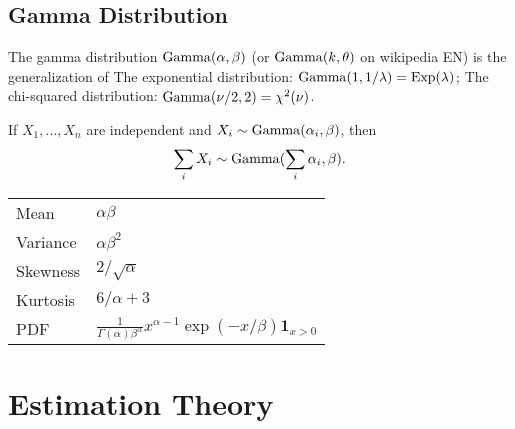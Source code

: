 \documentclass[10pt]{article}
\begin{document}
\subsection{Gamma Distribution}
\begin{outline}
  \1 The gamma distribution $\operatorname{Gamma}(\alpha,\beta)$ (or $\operatorname{Gamma}(k,\theta)$ on
  wikipedia EN) is the generalization of 
  \2 The exponential distribution:
  $\operatorname{Gamma}(1,1/\lambda) = \operatorname{Exp}(\lambda)$; 
  \2 The chi-squared distribution:
  $\operatorname{Gamma}(\nu/2,2) = \chi^2(\nu)$.

  \1 If $X_1,\dots,X_n$ are independent and $X_i\sim\operatorname{Gamma}(\alpha_i,\beta)$, then
  \begin{equation*}
    \sum_iX_i \sim \operatorname{Gamma}(\sum_i \alpha_i,\beta).
  \end{equation*}

  \1 
  \begin{tabular}{ll}
    \toprule
    Mean & $\alpha\beta$\\
    Variance & $\alpha\beta^2$\\
    Skewness & $2/\sqrt{\alpha}$\\
    Kurtosis & $6/\alpha + 3$\\
    PDF & $\displaystyle \frac{1}{\Gamma(\alpha)\beta^\alpha} x^{\alpha-1} \exp(-x/\beta)
          \bm 1_{x>0}$\\
    \bottomrule
  \end{tabular}
\end{outline}


\section{Estimation Theory}
\end{document}
